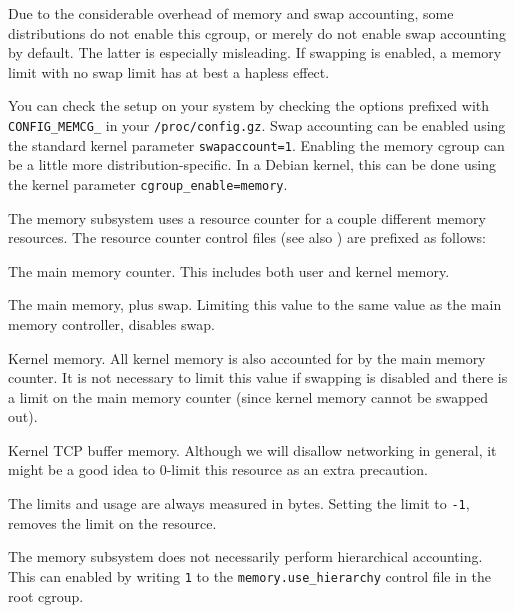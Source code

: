 Due to the considerable overhead of memory and swap accounting, some
distributions do not enable this cgroup, or merely do not enable swap
accounting by default. The latter is especially misleading. If swapping is
enabled, a memory limit with no swap limit has at best a hapless effect.

You can check the setup on your system by checking the options prefixed with
\texttt{CONFIG\_MEMCG\_} in your \texttt{/proc/config.gz}. Swap accounting can
be enabled using the standard kernel parameter
\texttt{swapaccount=1}\cite{kernel-parameters.txt}. Enabling the memory cgroup
can be a little more distribution-specific.  In a Debian kernel, this can be
done using the kernel parameter
\texttt{cgroup\_enable=memory}\cite{hutchings-2011}.

The memory subsystem uses a resource counter for a couple different memory
resources. The resource counter control files (see also
) are prefixed as follows:

\begin{description}[\setleftmargin{0.2in}\breaklabel\setlabelstyle{\tt}]

\item[memory]

The main memory counter. This includes both user and kernel memory.

\item[memory.memsw]

The main memory, plus swap. Limiting this value to the same value as the main
memory controller, disables swap.

\item[memory.kmem]

Kernel memory. All kernel memory is also accounted for by the main memory
counter. It is not necessary to limit this value if swapping is disabled and
there is a limit on the main memory counter (since kernel memory cannot be
swapped out).

\item[memory.kmem.tcp]

Kernel TCP buffer memory. Although we will disallow networking in general, it
might be a good idea to 0-limit this resource as an extra precaution.

\end{description}

The limits and usage are always measured in bytes. Setting the limit to
\texttt{-1}, removes the limit on the resource.

The memory subsystem does not necessarily perform hierarchical accounting. This
can enabled by writing \texttt{1} to the \texttt{memory.use\_hierarchy} control
file in the root cgroup.

